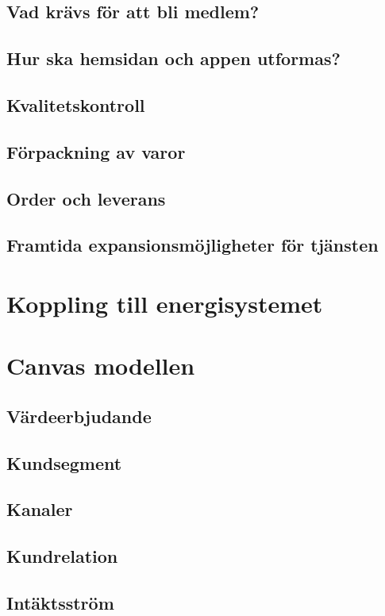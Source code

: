 \documentclass[10pt,a4paper,oneside]{article}
\begin{document}
\subsection{Vad krävs för att bli medlem?}
\subsection{Hur ska hemsidan och appen utformas?}
\subsection{Kvalitetskontroll}
\subsection{Förpackning av varor}
\subsection{Order och leverans}
\subsection{Framtida expansionsmöjligheter för tjänsten }
\newpage

\section{Koppling till energisystemet}
\newpage

\section{Canvas modellen}
\subsection{Värdeerbjudande}
\subsection{Kundsegment}
\subsection{Kanaler}
\subsection{Kundrelation}
\subsection{Intäktsström}
\end{document}
